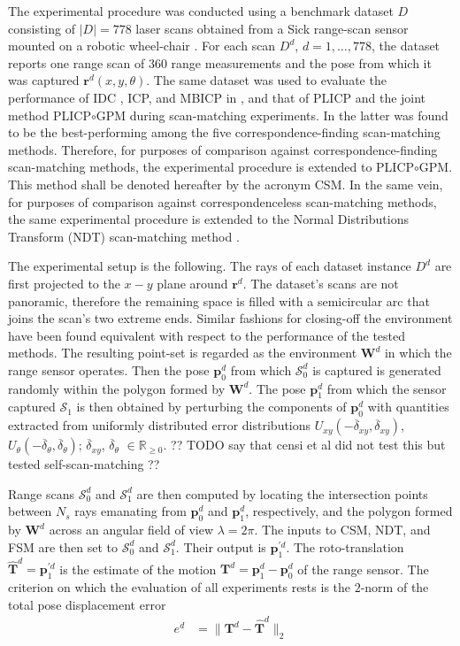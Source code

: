 The experimental procedure was conducted using a benchmark dataset $D$
consisting of $|D| = 778$ laser scans obtained from a Sick range-scan sensor
mounted on a robotic wheel-chair \cite{dataset_link}. For
each scan $D^d$, $d = 1,\dots,778$, the dataset reports one range scan of $360$
range measurements and the pose from which it was captured
$\bm{r}^d(x,y,\theta)$.  The same dataset was used to evaluate the performance
of IDC \cite{idc}, ICP, and MBICP in \cite{mbicp}, and that of PLICP and the
joint method PLICP$\circ$GPM during scan-matching experiments. In \cite{plicp}
the latter was found to be the best-performing among the five
correspondence-finding scan-matching methods. Therefore, for purposes of
comparison against correspondence-finding scan-matching methods, the
experimental procedure is extended to PLICP$\circ$GPM. This method shall be
denoted hereafter by the acronym CSM. In the same vein, for purposes of
comparison against correspondenceless scan-matching methods, the same
experimental procedure is extended to the Normal Distributions Transform (NDT)
scan-matching method \cite{ndt1}.

The experimental setup is the following. The rays of each dataset instance
$D^d$ are first projected to the $x-y$ plane around $\bm{r}^d$. The dataset's
scans are not panoramic, therefore the remaining space is filled with a
semicircular arc that joins the scan's two extreme ends. Similar fashions for
closing-off the environment have been found equivalent with respect to the
performance of the tested methods. The resulting point-set is regarded as the
environment $\bm{W}^d$ in which the range sensor operates.  Then the pose
$\bm{p}_0^d$ from which $\mathcal{S}_0^d$ is captured is generated randomly
within the polygon formed by $\bm{W}^d$. The pose $\bm{p}_1^d$ from which the
sensor captured $\mathcal{S}_1$ is then obtained by perturbing the components
of $\bm{p}_0^d$ with quantities extracted from uniformly distributed error
distributions $U_{xy}(-\overline{\delta}_{xy}, \overline{\delta}_{xy})$,
$U_{\theta}(-\overline{\delta}_{\theta}, \overline{\delta}_{\theta})$;
$\overline{\delta}_{xy}$, $\overline{\delta}_\theta$ $\in \mathbb{R}_{\geq 0}$.
?? TODO say that censi et al did not test this but tested self-scan-matching ??


Range scans $\mathcal{S}_0^d$ and $\mathcal{S}_1^d$ are then computed by
locating the intersection points between $N_s$ rays emanating from $\bm{p}_0^d$
and $\bm{p}_1^d$, respectively, and the polygon formed by $\bm{W}^d$ across an
angular field of view $\lambda = 2\pi$. The inputs to CSM, NDT, and FSM are
then set to $\mathcal{S}_0^d$ and $\mathcal{S}_1^d$. Their output is
$\bm{p}_1^{\prime d}$. The roto-translation
$\hat{\bm{T}}^d = \bm{p}_1^{\prime d}$ is the estimate of the motion
$\bm{T}^d = \bm{p}_1^d - \bm{p}_0^d$ of the range sensor. The criterion on
which the evaluation of all experiments rests is the $2$-norm of the total pose
displacement error
\begin{align}
  e^d &= \| \bm{T}^d - \hat{\bm{T}}^d \|_2
  \label{eq:rototranslation_error}
\end{align}

